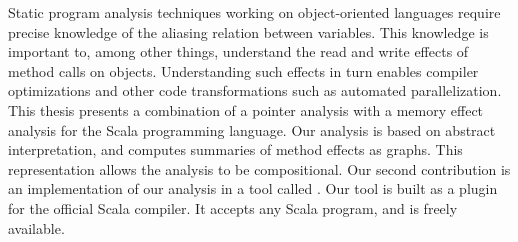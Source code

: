 Static program analysis techniques working on object-oriented languages require
precise knowledge of the aliasing relation between variables. This knowledge is
important to, among other things, understand the read and write effects of
method calls on objects. Understanding such effects in turn enables compiler
optimizations and other code transformations such as automated parallelization.
This thesis presents a combination of a pointer analysis with a memory effect
analysis for the Scala programming language. Our analysis is based on abstract
interpretation, and computes summaries of method effects as graphs. This
representation allows the analysis to be compositional. Our second contribution
is an implementation of our analysis in a tool called \insane. Our tool is
built as a plugin for the official Scala compiler. It accepts any Scala
program, and is freely available.
